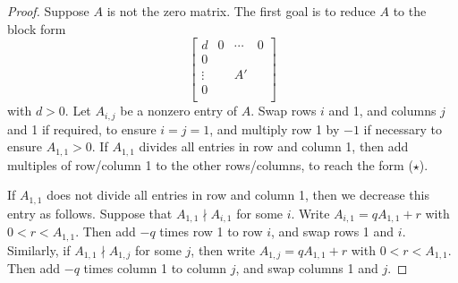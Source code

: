 \documentclass[12pt,a4paper,answers]{exam}
\theoremstyle{definition}
\begin{document}
\begin{proof}
  Suppose $A$ is not the zero matrix. The first goal is to reduce $A$ to the block form
  \[ \left[
    \begin{array}{c|ccc}
      d & 0 & \cdots & 0 \\
      \hline
      0 & & & \\
      \vdots & & A' & \\
      0 & & & \\
    \end{array}\right] \tag{$\star$}
  \]
  with $d>0$. Let $A_{i,j}$ be a nonzero entry of $A$. Swap rows $i$ and 1, and columns $j$ and 1 if required, to ensure $i=j=1$, and multiply row 1 by $-1$ if necessary to ensure $A_{1,1}>0$. If $A_{1,1}$ divides all entries in row and column 1, then add multiples of row/column 1 to the other rows/columns, to reach the form ($\star$).

  If $A_{1,1}$ does not divide all entries in row and column 1, then we decrease this entry as follows. Suppose that $A_{1,1}\nmid A_{i,1}$ for some $i$. Write $A_{i,1}=qA_{1,1}+r$ with $0<r<A_{1,1}$. Then add $-q$ times row 1 to row $i$, and swap rows 1 and $i$. Similarly, if $A_{1,1}\nmid A_{1,j}$ for some $j$, then write $A_{1,j}=qA_{1,1}+r$ with $0<r<A_{1,1}$. Then add $-q$ times column 1 to column $j$, and swap columns 1 and $j$.


\end{proof}
\end{document}
